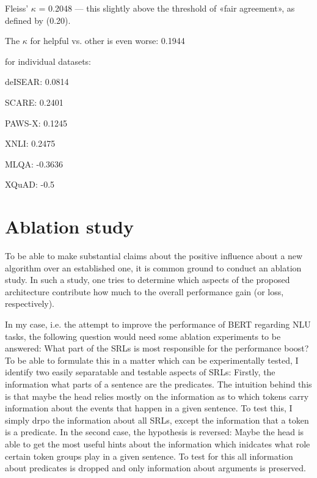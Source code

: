 


Fleiss' $\kappa$ = 0.2048 --- this slightly above the threshold of «fair agreement», as defined by \citep{landis1977measurement} (0.20).

The $\kappa$ for helpful vs. other is even worse: 0.1944

for individual datasets:

deISEAR: 0.0814

SCARE: 0.2401

PAWS-X: 0.1245

XNLI: 0.2475

MLQA: -0.3636

XQuAD: -0.5



\cite{do2018flexible}


\section{Ablation study}
\label{sec:ablation}

To be able to make substantial claims about the positive influence about a new algorithm over an
established one, it is common ground to conduct an ablation study. In such a study, one tries to
determine which aspects of the proposed architecture contribute how much to the overall performance
gain (or loss, respectively).

In my case, i.e. the attempt to improve the performance of BERT regarding NLU tasks, the
following question would need some ablation experiments to be answered: What part of the
SRLs is most responsible for the performance boost? To be able to formulate this in a
matter which can be experimentally tested, I identify two easily separatable and testable
aspects of SRLs: Firstly, the information what parts of a sentence are the predicates.
The intuition behind this is that maybe the head relies mostly on the information as to
which tokens carry information about the events that happen in a given sentence. To test
this, I simply drpo the information about all SRLs, except the information that a token
is a predicate. In the second case, the hypothesis is reversed: Maybe the head is able to
get the most useful hints about the information which inidcates what role certain token
groups play in a given sentence. To test for this all information about predicates is
dropped and only information about arguments is preserved.

